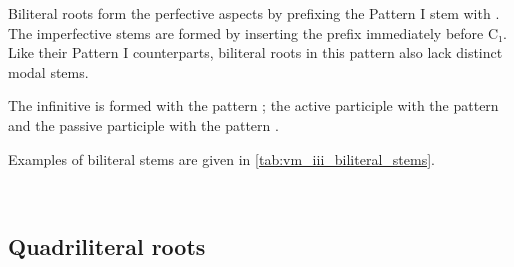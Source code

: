 \documentclass[grammar]{subfiles}
\begin{document}
Biliteral roots form the perfective aspects by prefixing the Pattern I stem
with .  The imperfective stems are formed by inserting the prefix
 immediately before C₁.  Like their Pattern I counterparts, biliteral
roots in this pattern also lack distinct modal stems. 

The infinitive is formed with the pattern ; the active participle
with the pattern  and the passive participle with the pattern
. 

Examples of biliteral stems are given in \cref{tab:vm_iii_biliteral_stems}. 

\begin{table}[h!]\small\capstart
  \centering
  \\
  \caption{Pattern III biliteral stems \label{tab:vm_iii_biliteral_stems}}
\end{table}
    

\subsection{Quadriliteral roots}
\label{ssec:vm_iii_quadriliteral_roots}
\end{document}
